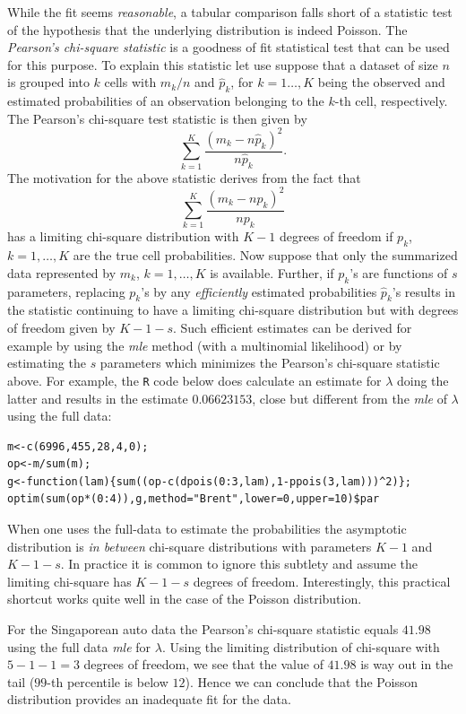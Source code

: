 \documentclass[]{book}
\theoremstyle{definition}
\theoremstyle{definition}
\theoremstyle{definition}
\theoremstyle{remark}
\begin{document}
While the fit seems \emph{reasonable}, a tabular comparison falls short
of a statistic test of the hypothesis that the underlying distribution
is indeed Poisson. The \emph{Pearson's chi-square statistic} is a
goodness of fit statistical test that can be used for this purpose. To
explain this statistic let use suppose that a dataset of size \(n\) is
grouped into \(k\) cells with \(m_k/n\) and \(\hat{p}_k\), for
\(k=1\ldots,K\) being the observed and estimated probabilities of an
observation belonging to the \(k\)-th cell, respectively. The Pearson's
chi-square test statistic is then given by \[
\sum_{k=1}^K\frac{\left( m_k-n\widehat{p}_k \right) ^{2}}{n\widehat{p}_k}.
\] The motivation for the above statistic derives from the fact that \[
\sum_{k=1}^K\frac{\left( m_k-n{p}_k \right) ^{2}}{n{p}_k}
\] has a limiting chi-square distribution with \(K-1\) degrees of
freedom if \(p_k\), \(k=1,\ldots,K\) are the true cell probabilities.
Now suppose that only the summarized data represented by \(m_k\),
\(k=1,\ldots,K\) is available. Further, if \(p_k\)'s are functions of
\(s\) parameters, replacing \(p_k\)'s by any \emph{efficiently}
estimated probabilities \(\widehat{p}_k\)'s results in the statistic
continuing to have a limiting chi-square distribution but with degrees
of freedom given by \(K-1-s\). Such efficient estimates can be derived
for example by using the \emph{mle} method (with a multinomial
likelihood) or by estimating the \(s\) parameters which minimizes the
Pearson's chi-square statistic above. For example, the \texttt{R} code
below does calculate an estimate for \(\lambda\) doing the latter and
results in the estimate \(0.06623153\), close but different from the
\emph{mle} of \(\lambda\) using the full data:

\begin{verbatim}
m<-c(6996,455,28,4,0);
op<-m/sum(m);
g<-function(lam){sum((op-c(dpois(0:3,lam),1-ppois(3,lam)))^2)};
optim(sum(op*(0:4)),g,method="Brent",lower=0,upper=10)$par
\end{verbatim}

When one uses the full-data to estimate the probabilities the asymptotic
distribution is \emph{in between} chi-square distributions with
parameters \(K-1\) and \(K-1-s\). In practice it is common to ignore
this subtlety and assume the limiting chi-square has \(K-1-s\) degrees
of freedom. Interestingly, this practical shortcut works quite well in
the case of the Poisson distribution.

For the Singaporean auto data the Pearson's chi-square statistic equals
\(41.98\) using the full data \emph{mle} for \({\lambda}\). Using the
limiting distribution of chi-square with \(5-1-1=3\) degrees of freedom,
we see that the value of \(41.98\) is way out in the tail (\(99\)-th
percentile is below \(12\)). Hence we can conclude that the Poisson
distribution provides an inadequate fit for the data.
\end{document}
